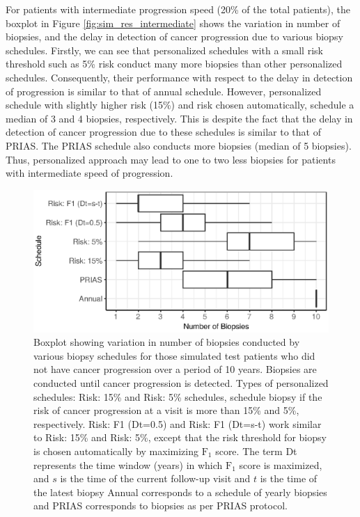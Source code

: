For patients with intermediate progression speed (20\% of the total patients), the boxplot in Figure \ref{fig:sim_res_intermediate} shows the variation in number of biopsies, and the delay in detection of cancer progression due to various biopsy schedules. Firstly, we can see that personalized schedules with a small risk threshold such as 5\% risk conduct many more biopsies than other personalized schedules. Consequently, their performance with respect to the delay in detection of progression is similar to that of annual schedule. However, personalized schedule with slightly higher risk (15\%) and risk chosen automatically, schedule a median of 3 and 4 biopsies, respectively. This is despite the fact that the delay in detection of cancer progression due to these schedules is similar to that of PRIAS. The PRIAS schedule also conducts more biopsies (median of 5 biopsies). Thus, personalized approach may lead to one to two less biopsies for patients with intermediate speed of progression.

\begin{figure}[!htb]
\captionsetup{justification=justified}
\centerline{\includegraphics[width=\columnwidth]{images/sim_res_slow.eps}}
\caption{Boxplot showing variation in number of biopsies conducted by various biopsy schedules for those simulated test patients who did not have cancer progression over a period of 10 years. Biopsies are conducted until cancer progression is detected. Types of personalized schedules: Risk: 15\% and Risk: 5\% schedules, schedule biopsy if the risk of cancer progression at a visit is more than 15\% and 5\%, respectively. Risk: F1 (Dt=0.5) and Risk: F1 (Dt=s-t) work similar to Risk: 15\% and Risk: 5\%, except that the risk threshold for biopsy is chosen automatically by maximizing $\mbox{F}_1$ score. The term Dt represents the time window (years) in which $\mbox{F}_1$ score is maximized, and $s$ is the time of the current follow-up visit and $t$ is the time of the latest biopsy  Annual corresponds to a schedule of yearly biopsies and PRIAS corresponds to biopsies as per PRIAS protocol.}
\label{fig:sim_res_slow}
\end{figure}

